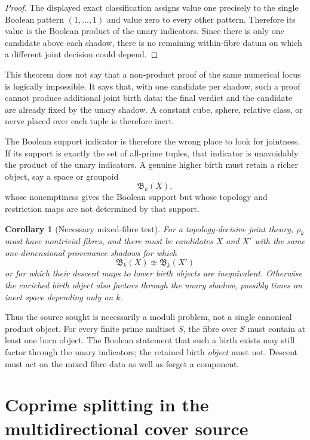 \documentclass[11pt]{article}
\newtheorem{corollary}[theorem]{Corollary}
\begin{document}
\begin{proof}
The displayed exact classification assigns value one precisely to the single
Boolean pattern \((1,\ldots,1)\) and value zero to every other pattern.
Therefore its value is the Boolean product of the unary indicators.  Since
there is only one candidate above each shadow, there is no remaining
within-fibre datum on which a different joint decision could depend.
\end{proof}

This theorem does not say that a non-product proof of the same numerical locus
is logically impossible.  It says that, with one candidate per shadow, such a
proof cannot produce additional joint birth data: the final verdict and the
candidate are already fixed by the unary shadow.  A constant cube, sphere,
relative class, or nerve placed over each tuple is therefore inert.

The Boolean support indicator is therefore the wrong place to look for
jointness.  If its support is exactly the set of all-prime tuples, that
indicator is unavoidably the product of the unary indicators.  A genuine
higher birth must retain a richer object, say a space or groupoid
\[
\mathfrak B_k(X),
\]
whose nonemptiness gives the Boolean support but whose topology and restriction
maps are not determined by that support.

\begin{corollary}[Necessary mixed-fibre test]
\label{cor:mixed-fibre}
For a topology-decisive joint theory, \(\rho_k\) must have nontrivial fibres,
and there must be candidates \(X\) and \(X'\) with the same one-dimensional
provenance shadows for which
\[
\mathfrak B_k(X)\not\simeq\mathfrak B_k(X')
\]
or for which their descent maps to lower birth objects are inequivalent.
Otherwise the enriched birth object also factors through the unary shadow,
possibly times an inert space depending only on \(k\).
\end{corollary}

Thus the source sought is necessarily a moduli problem, not a single canonical
product object.  For every finite prime multiset \(S\), the fibre over \(S\)
must contain at least one born object.  The Boolean statement that such a birth
exists may still factor through the unary indicators; the retained birth
\emph{object} must not.  Descent must act on the mixed fibre data as well as
forget a component.

\section{Coprime splitting in the multidirectional cover source}
\end{document}

